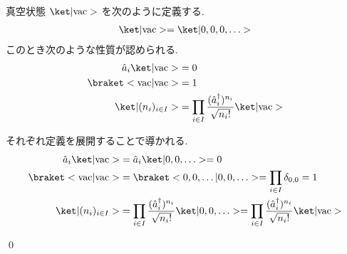 \documentclass[uplatex,dvipdfmx,a4paper,11pt]{jlreq}
\makeatletter
\numberwithin{equation}{section}
\theoremstyle{definition}
\renewenvironment{proof}[1][\proofname]{\par
  \normalfont
  \topsep6\p@\@plus6\p@ \trivlist
  \item[\hskip\labelsep{\bfseries #1}\@addpunct{\bfseries}]\ignorespaces\quad\par
}{
  \qed\endtrivlist\@endpefalse
}
\renewcommand\proofname{証明}
\makeatother
\begin{document}
\begin{proposition}
  真空状態 $\ket|\mathrm{vac}>$ を次のように定義する.
  \begin{align}
    \ket|\mathrm{vac}> = \ket|0,0,0,\ldots>
  \end{align}
  このとき次のような性質が認められる.
  \begin{align}
    \hat{a}_i\ket|\mathrm{vac}>        & = 0                                                                             \\
    \braket<\mathrm{vac}|\mathrm{vac}> & = 1                                                                             \\
    \ket|(n_i)_{i\in I}>               & = \prod_{i\in I}\frac{(\hat{a}_i^\dagger)^{n_i}}{\sqrt{n_i!}}\ket|\mathrm{vac}>
  \end{align}
\end{proposition}
\begin{proof}
  それぞれ定義を展開することで導かれる.
  \begin{align}
    \hat{a}_i\ket|\mathrm{vac}>        & = \hat{a}_i\ket|0,0,\ldots> = 0                                                                                                                               \\
    \braket<\mathrm{vac}|\mathrm{vac}> & = \braket<0,0,\ldots|0,0,\ldots> = \prod_{i\in I}\delta_{0,0} = 1                                                                                             \\
    \ket|(n_i)_{i\in I}>               & = \prod_{i\in I}\frac{(\hat{a}_i^\dagger)^{n_i}}{\sqrt{n_i!}}\ket|0,0,\ldots> = \prod_{i\in I}\frac{(\hat{a}_i^\dagger)^{n_i}}{\sqrt{n_i!}}\ket|\mathrm{vac}>
  \end{align}
\end{proof}
\end{document}
